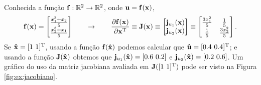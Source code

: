 \begin{example}
Conhecida a função $\VECTOR{f}: \mathbb{R}^2 \rightarrow \mathbb{R}^2$,
onde $\VECTOR{u}=\VECTOR{f}(\VECTOR{x})$, 
\begin{equation}
\VECTOR{f}(\VECTOR{x})=
\begin{bmatrix}
\frac{x_1^3+x_2}{5}\\
\frac{x_2^3+x_1}{5}
\end{bmatrix}
\qquad \rightarrow \qquad
\frac{\partial \VECTOR{f}(\VECTOR{x}) }{\partial \VECTOR{x}^{\transpose}}\equiv
\MATRIX{J}(\VECTOR{x})\equiv
\begin{bmatrix}
\VECTOR{j}_{u_1}(\VECTOR{x})\\
\VECTOR{j}_{u_2}(\VECTOR{x})
\end{bmatrix}\equiv
\begin{bmatrix}
\frac{3 x_1^2}{5} & \frac{1}{5}\\
\frac{1}{5}       & \frac{3 x_2^2}{5}
\end{bmatrix}.
\end{equation}
Se $\VECTOR{\hat{x}}=[1~ 1]^{\transpose}$, usando a função $\VECTOR{f}(\VECTOR{\hat{x}})$ 
podemos calcular que $\VECTOR{\hat{u}}=[0.4~ 0.4]^{\transpose}$;
e usando a função $\MATRIX{J}(\VECTOR{\hat{x}})$ obtemos que $\VECTOR{j}_{u_1}(\VECTOR{\hat{x}})=[0.6~ 0.2]$ e $\VECTOR{j}_{u_2}(\VECTOR{\hat{x}})=[0.2~ 0.6]$.
Um gráfico do uso da matriz jacobiana avaliada em $\MATRIX{J}([1~ 1]^{\transpose})$ pode ser visto na Figura \ref{fig:ex:jacobiano}.
\end{example}

